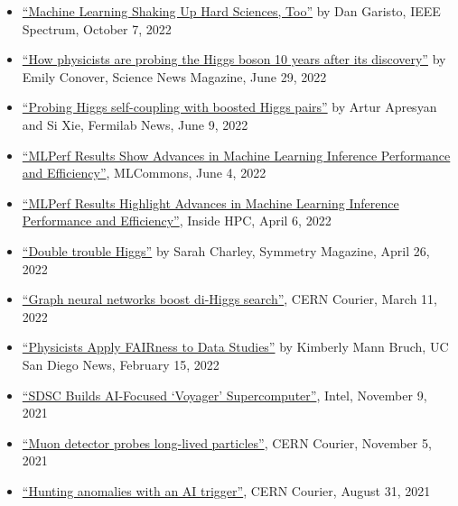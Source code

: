\documentclass[11pt]{res}
\begin{document}
\begin{resume}
  \begin{itemize}
    \itemsep-0.3em
    \item \href{https://spectrum.ieee.org/machine-learning-in-physics}{``Machine Learning Shaking Up Hard Sciences, Too''} by Dan Garisto, IEEE Spectrum, October 7, 2022
    \item \href{https://www.sciencenews.org/article/higgs-boson-particle-physics-standard-model-discovery-anniversary}{``How physicists are probing the Higgs boson 10 years after its discovery''} by Emily Conover, Science News Magazine, June 29, 2022
    \item \href{https://news.fnal.gov/2022/06/probing-higgs-self-coupling-with-boosted-higgs-pairs/}{``Probing Higgs self-coupling with boosted Higgs pairs''} by Artur Apresyan and Si Xie, Fermilab News, June 9, 2022
    \item \href{https://mlcommons.org/en/news/mlperf-inference-1q2022/}{``MLPerf Results Show Advances in Machine Learning Inference Performance and Efficiency''}, MLCommons, June 4, 2022
    \item \href{https://insidehpc.com/2022/04/mlperf-results-highlight-advances-in-machine-learning-inference-performance-and-efficiency/}{``MLPerf Results Highlight Advances in Machine Learning Inference Performance and Efficiency''}, Inside HPC, April 6, 2022
    \item \href{https://www.symmetrymagazine.org/article/double-trouble-higgs}{``Double trouble Higgs''} by Sarah Charley, Symmetry Magazine, April 26, 2022
    \item \href{https://cerncourier.com/a/graph-neural-networks-boost-di-higgs-search/}{``Graph neural networks boost di-Higgs search''}, CERN Courier, March 11, 2022
    \item \href{https://ucsdnews.ucsd.edu/pressrelease/physicists-apply-fairness-to-data-studies}{``Physicists Apply FAIRness to Data Studies''} by Kimberly Mann Bruch, UC San Diego News, February 15, 2022
    \item \href{https://www.intel.com/content/www/us/en/customer-spotlight/stories/san-diego-supercomputer-customer-story.html}{``SDSC Builds AI-Focused `Voyager' Supercomputer''}, Intel, November 9, 2021
    \item \href{https://cerncourier.com/a/muon-detector-probes-long-lived-particles/}{``Muon detector probes long-lived particles''}, CERN Courier, November 5, 2021
    \item \href{https://cerncourier.com/a/hunting-anomalies-with-an-ai-trigger/}{``Hunting anomalies with an AI trigger''}, CERN Courier, August 31, 2021

\end{itemize}
\end{resume}
\end{document}
